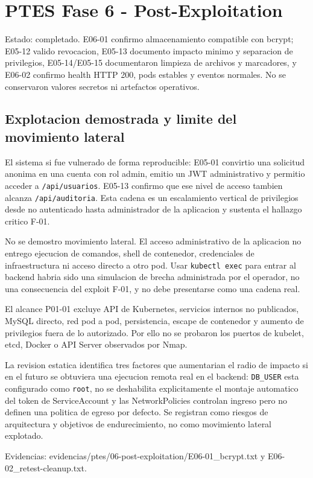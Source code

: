 \section{PTES Fase 6 - Post-Exploitation}\label{ptes-fase-6---post-exploitation}

Estado: completado. E06-01 confirmo almacenamiento compatible con bcrypt; E05-12 valido revocacion, E05-13 documento impacto minimo y separacion de privilegios, E05-14/E05-15 documentaron limpieza de archivos y marcadores, y E06-02 confirmo health HTTP 200, pods estables y eventos normales. No se conservaron valores secretos ni artefactos operativos.

\subsection{Explotacion demostrada y limite del movimiento lateral}\label{explotacion-demostrada-y-limite-del-movimiento-lateral}

El sistema si fue vulnerado de forma reproducible: E05-01 convirtio una solicitud anonima en una cuenta con rol admin, emitio un JWT administrativo y permitio acceder a \texttt{/api/usuarios}. E05-13 confirmo que ese nivel de acceso tambien alcanza \texttt{/api/auditoria}. Esta cadena es un escalamiento vertical de privilegios desde no autenticado hasta administrador de la aplicacion y sustenta el hallazgo critico F-01.

No se demostro movimiento lateral. El acceso administrativo de la aplicacion no entrego ejecucion de comandos, shell de contenedor, credenciales de infraestructura ni acceso directo a otro pod. Usar \texttt{kubectl\ exec} para entrar al backend habria sido una simulacion de brecha administrada por el operador, no una consecuencia del exploit F-01, y no debe presentarse como una cadena real.

El alcance P01-01 excluye API de Kubernetes, servicios internos no publicados, MySQL directo, red pod a pod, persistencia, escape de contenedor y aumento de privilegios fuera de lo autorizado. Por ello no se probaron los puertos de kubelet, etcd, Docker o API Server observados por Nmap.

La revision estatica identifica tres factores que aumentarian el radio de impacto si en el futuro se obtuviera una ejecucion remota real en el backend: \texttt{DB\_USER} esta configurado como \texttt{root}, no se deshabilita explicitamente el montaje automatico del token de ServiceAccount y las NetworkPolicies controlan ingreso pero no definen una politica de egreso por defecto. Se registran como riesgos de arquitectura y objetivos de endurecimiento, no como movimiento lateral explotado.

Evidencias: evidencias/ptes/06-post-exploitation/E06-01\_bcrypt.txt y E06-02\_retest-cleanup.txt.
